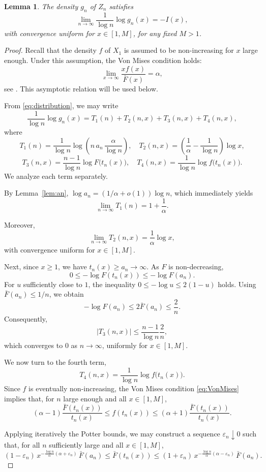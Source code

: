 \documentclass[11pt,reqno]{amsart}
\newtheorem{lemma}[theorem]{Lemma}
\theoremstyle{definition}
\theoremstyle{remark}
\numberwithin{equation}{section}
\begin{document}
\begin{lemma}\label{lem:uniform}
The density $g_n$ of $Z_n$ satisfies
\[
\lim_{n\to\infty}\frac{1}{\log n}\log g_n(x)=-I(x),
\]
with convergence uniform for $x\in[1,M]$, for any fixed $M>1$.
\end{lemma}

\begin{proof}
Recall that the density $f$ of $X_1$ is assumed to be non-increasing for $x$
large enough. Under this assumption, the Von Mises condition holds:
\begin{equation}\label{eq:VonMises}
\lim_{x\to\infty}\frac{x f(x)}{\bar F(x)}=\alpha,
\end{equation}
see \cite[Proposition~1.15(b)]{resnick}. This asymptotic relation will be used
 below.

From \eqref{eq:distribution}, we may write
\[
\frac{1}{\log n}\log g_n(x)
=
T_1(n)+T_2(n,x)+T_3(n,x)+T_4(n,x),
\]
where
\[
T_1(n)
=\frac{1}{\log n}\log\!\left(n\,a_n\,\frac{\alpha}{\log n}\right),\quad
T_2(n,x)
=\left(\frac{1}{\alpha}-\frac{1}{\log n}\right)\log x,
\]
\[
T_3(n,x)
=\frac{n-1}{\log n}\log F\!\bigl(t_n(x)\bigr),\quad
T_4(n,x)
=\frac{1}{\log n}\log f\!\bigl(t_n(x)\bigr).
\]
We analyze each term separately.

By Lemma~\ref{lem:an}, $\log a_n=(1/\alpha+o(1))\log n$, which immediately yields
\[
\lim_{n\to\infty}T_1(n)=1+\frac{1}{\alpha}.
\]

Moreover,
\[
\lim_{n\to\infty}T_2(n,x)=\frac{1}{\alpha}\log x,
\]
with convergence uniform for $x\in[1,M]$.

Next, since $x\ge1$, we have $t_n(x)\ge a_n\to\infty$. As $F$ is non-decreasing,
\[
0\le -\log F(t_n(x))\le -\log F(a_n).
\]
For $u$ sufficiently close to $1$, the inequality $0\le -\log u\le 2(1-u)$ holds.
Using $\bar F(a_n)\le 1/n$, we obtain
\[
-\log F(a_n)\le 2\bar F(a_n)\le \frac{2}{n}.
\]
Consequently,
\[
|T_3(n,x)|
\le
\frac{n-1}{\log n}\frac{2}{n},
\]
which converges to $0$ as $n\to\infty$, uniformly for $x\in[1,M]$.

We now turn to the fourth term,
\[
T_4(n,x)=\frac{1}{\log n}\log f\bigl(t_n(x)\bigr).
\]
Since $f$ is eventually non-increasing, the Von Mises condition
\eqref{eq:VonMises} implies that, for $n$ large enough and all $x\in[1,M]$,
\begin{equation}\label{eq:vm-bounds}
(\alpha-1)\frac{\bar F(t_n(x))}{t_n(x)}
\le
f(t_n(x))
\le
(\alpha+1)\frac{\bar F(t_n(x))}{t_n(x)}.
\end{equation}

Applying iteratively the Potter bounds, we may construct a sequence
$\varepsilon_n\downarrow0$ such that, for all $n$ sufficiently large and all
$x\in[1,M]$,
\begin{equation}\label{eq:potter-tn}
(1-\varepsilon_n)\,
x^{-\frac{\log n}{\alpha}(\alpha+\varepsilon_n)}\,\bar{F}(a_n)
\le \bar{F}(t_n(x))
\le (1+\varepsilon_n)\,
x^{-\frac{\log n}{\alpha}(\alpha-\varepsilon_n)}\,\bar{F}(a_n).
\end{equation}


\end{proof}
\end{document}
